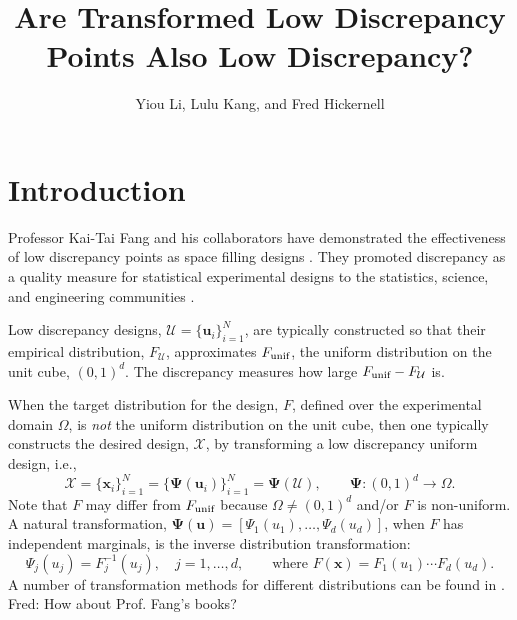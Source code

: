 \documentclass[graybox]{svmult}
\newcommand{\vx}{\boldsymbol{x}}
\newcommand{\vu}{\boldsymbol{u}}
\newcommand{\vPsi}{\boldsymbol{\Psi}}
\newcommand{\Udes}{\mathcal{U}}
\newcommand{\Xdes}{\mathcal{X}}
\newcommand{\Ftar}{F}
\newcommand{\cube}{\ensuremath{(0,1)^d}}
\newcommand{\unif}{\textup{unif}}
\newcommand{\FJH}[1]{{\color{blue}Fred: #1}}
\begin{document}
\title*{Are Transformed Low Discrepancy Points Also Low Discrepancy?}
\author{Yiou Li, Lulu Kang, and Fred Hickernell}
%
%
\maketitle


\section{Introduction}

Professor Kai-Tai Fang and his collaborators have demonstrated the effectiveness of low discrepancy points as space filling designs \cite{FanWan94, FanLiSud06, FangHic07a}.  
They promoted discrepancy as a quality measure for statistical experimental designs to the statistics, science, and engineering communities \cite{FanMaWin02, FanMuk00, FanMa01a, FanMa01b}. 

Low discrepancy designs, $\Udes = \{\vu_i\}_{i=1}^N$, are typically constructed so that their empirical distribution, $F_\Udes$, approximates $F_\unif$, the uniform distribution on the unit cube, \cube.  
The discrepancy measures how large $F_\unif-F_\Udes$ is.  

When the target distribution for the design, $\Ftar$, defined over the experimental domain $\Omega$, is \emph{not} the uniform distribution on the unit cube, then one typically constructs the desired design, $\Xdes$, by transforming a low discrepancy uniform design, i.e., 
\begin{equation} \label{eq:transPts}
\Xdes = \{\vx_i\}_{i=1}^N = \{\vPsi(\vu_i)\}_{i=1}^N = \vPsi(\Udes), \qquad \vPsi: \cube \to \Omega.
\end{equation}
Note that $\Ftar$ may differ from $F_\unif$ because $\Omega \ne \cube$ and/or $\Ftar$ is non-uniform.  
A natural transformation, $\vPsi(\vu)=[\Psi_1(u_1),\ldots,\Psi_d(u_d)]$, when $\Ftar$ has independent marginals, is the inverse distribution transformation:
\begin{equation}\label{eq:inverse}
\Psi_j(u_j) = F_j^{-1}(u_j), \quad j =1, \ldots, d, \qquad \text{where } \Ftar(\vx) = F_1(u_1) \cdots F_d(u_d).
\end{equation}
A number of transformation methods for different distributions can be found in \cite{devroye2006nonuniform}. \FJH{How about Prof. Fang's books?}
\end{document}
